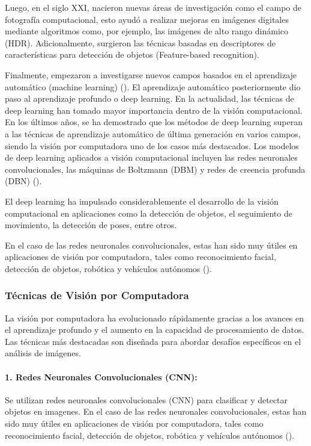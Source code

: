 Luego, en el siglo XXI, nacieron nuevas áreas de investigación como el campo de fotografía computacional, esto ayudó a realizar mejoras en imágenes digitales mediante algoritmos como, por ejemplo, las imágenes de alto rango dinámico (HDR). Adicionalmente, surgieron las técnicas basadas en descriptores de características para detección de objetos (Feature-based recognition). 

Finalmente, empezaron a investigarse nuevos campos basados en el aprendizaje automático (machine learning) (\cite{szeliski2010computer}). El aprendizaje automático posteriormente dio paso al aprendizaje profundo o deep learning. 
En la actualidad, las técnicas de deep learning han tomado mayor importancia dentro de la visión computacional. En los últimos años, se ha demostrado que los métodos de deep learning superan a las técnicas de aprendizaje automático de última generación en varios campos, siendo la visión por computadora uno de los casos más destacados. Los modelos de deep learning aplicados a visión computacional incluyen las redes neuronales convolucionales, las máquinas de Boltzmann (DBM) y redes de creencia profunda (DBN) (\cite{voulodimos2018deep}). 

El deep learning ha impulsado considerablemente el desarrollo de la visión computacional en aplicaciones como la detección de objetos, el seguimiento de movimiento, la detección de poses, entre otros. 

En el caso de las redes neuronales convolucionales, estas han sido muy útiles en aplicaciones de visión por computadora, tales como reconocimiento facial, detección de objetos, robótica y vehículos autónomos (\cite{voulodimos2018deep}). 

\subsubsection{Técnicas de Visión por Computadora}
La visión por computadora ha evolucionado rápidamente gracias a los avances en el aprendizaje profundo y el aumento en la capacidad de procesamiento de datos. Las técnicas más destacadas son diseñada para abordar desafíos específicos en el análisis de imágenes.

\paragraph{1. Redes Neuronales Convolucionales (CNN):}
Se utilizan redes neuronales convolucionales (CNN) para clasificar y detectar objetos en imagenes. En el caso de las redes neuronales convolucionales, estas han sido muy útiles en aplicaciones de visión por computadora, tales como reconocimiento facial, detección de objetos, robótica y vehículos autónomos (\cite{voulodimos2018deep}). 

